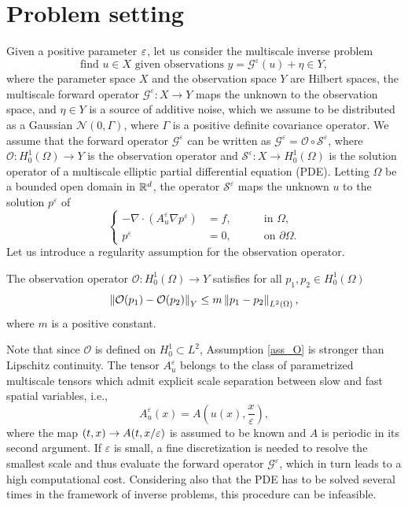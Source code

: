 \documentclass[10pt]{article}
\begin{document}
\section{Problem setting}\label{Setting}

Given a positive parameter $\varepsilon$, let us consider the multiscale inverse problem
\begin{equation}
\label{multiscale_inverse_problem}
\text{find } u \in X \text{ given observations } y = \mathcal{G}^{\varepsilon}(u) + \eta \in Y,
\end{equation}
where the parameter space $X$ and the observation space $Y$ are Hilbert spaces, the multiscale forward operator $\mathcal{G}^{\varepsilon} \colon X \to Y$ maps the unknown to the observation space, and $\eta \in Y$ is a source of additive noise, which we assume to be distributed as a Gaussian $\mathcal N(0, \Gamma)$, where $\Gamma$ is a positive definite covariance operator. We assume that the forward operator $\mathcal{G}^{\varepsilon}$ can be written as $\mathcal{G}^{\varepsilon} = \mathcal{O} \circ \mathcal{S}^{\varepsilon}$, where $\mathcal{O} \colon H^1_0(\Omega) \to Y$ is the observation operator and $\mathcal{S}^{\varepsilon} \colon X \to H^1_0(\Omega)$ is the solution operator of a multiscale elliptic partial differential equation (PDE). Letting $\Omega$ be a bounded open domain in $\mathbb{R}^d$, the operator $\mathcal{S}^{\varepsilon}$ maps the unknown $u$ to the solution $p^{\varepsilon}$ of
\begin{equation}
\label{intro_problem_multiscale}
\left\{
\begin{alignedat}{2}
- \nabla \cdot ( A^{\varepsilon}_u \nabla p^{\varepsilon} ) &= f, \quad && \text{ in } \Omega, \\
	p^{\varepsilon} &= 0, \quad && \text{ on } \partial \Omega.
\end{alignedat}
\right.
\end{equation}
Let us introduce a regularity assumption for the observation operator.
\begin{assumption}\label{ass_O}
The observation operator $\mathcal{O} \colon H^1_0(\Omega) \to Y$ satisfies for all $p_1, p_2 \in H^1_0(\Omega)$
\[ \left\|\mathcal{O}(p_1) - \mathcal{O}(p_2)\right\|_Y \le m \left\|p_1 - p_2\right\|_{L^2(\Omega)}, \]
where $m$ is a positive constant.
\end{assumption}
Note that since $\mathcal O$ is defined on $H^1_0 \subset L^2$, Assumption \ref{ass_O} is stronger than Lipschitz continuity. The tensor $A^{\varepsilon}_u$ belongs to the class of parametrized multiscale tensors which admit explicit scale separation between slow and fast spatial variables, i.e.,
\begin{equation*}
A^{\varepsilon}_u(x) = A \left ( u(x), \frac{x}{\varepsilon} \right ),
\end{equation*}
where the map $(t,x) \to A(t, x/\varepsilon)$ is assumed to be known and $A$ is periodic in its second argument. If $\varepsilon$ is small, a fine discretization is needed to resolve the smallest scale and thus evaluate the forward operator $\mathcal{G}^{\varepsilon}$, which in turn leads to a high computational cost. Considering also that the PDE has to be solved several times in the framework of inverse problems, this procedure can be infeasible.
\end{document}
